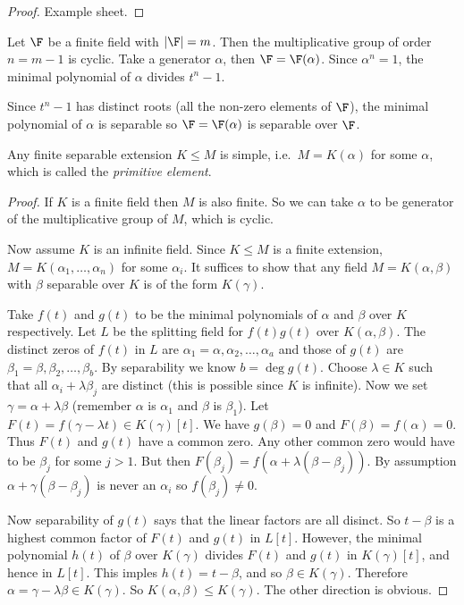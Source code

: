 \documentclass[a4paper]{article}
\begin{document}
\begin{proof}
  Example sheet.
\end{proof}

\begin{eg}
  Let \(\F\) be a finite field with \(|\F| = m\). Then the multiplicative group of order \(n = m - 1\) is cyclic. Take a generator \(\alpha\), then \(\F = \F(\alpha)\). Since \(\alpha^n = 1\), the minimal polynomial of \(\alpha\) divides \(t^n - 1\).

  Since \(t^n - 1\) has distinct roots (all the non-zero elements of \(\F\)), the minimal polynomial of \(\alpha\) is separable so \(\F = \F(\alpha)\) is separable over \(\F\).
\end{eg}

\begin{theorem}
  \label{thm:primitive}
  Any finite separable extension \(K \leq M\) is simple, i.e.\ \(M = K(\alpha)\) for some \(\alpha\), which is called the \emph{primitive element}.
\end{theorem}

\begin{proof}
  \label{proof:primitive}
  If \(K\) is a finite field then \(M\) is also finite. So we can take \(\alpha\) to be generator of the multiplicative group of \(M\), which is cyclic.

  Now assume \(K\) is an infinite field. Since \(K \leq M\) is a finite extension, \(M = K(\alpha_1, \dots, \alpha_n)\) for some \(\alpha_i\). It suffices to show that any field \(M = K(\alpha, \beta)\) with \(\beta\) separable over \(K\) is of the form \(K(\gamma)\).

  Take \(f(t)\) and \(g(t)\) to be the minimal polynomials of \(\alpha\) and \(\beta\) over \(K\) respectively. Let \(L\) be the splitting field for \(f(t)g(t)\) over \(K(\alpha, \beta)\). The distinct zeros of \(f(t)\) in \(L\) are \(\alpha_1 = \alpha, \alpha_2, \dots, \alpha_a\) and those of \(g(t)\) are \(\beta_1 = \beta, \beta_2, \dots, \beta_b\). By separability we know \(b = \deg g(t)\). Choose \(\lambda \in K\) such that all \(\alpha_i + \lambda \beta_j\) are distinct (this is possible since \(K\) is infinite). Now we set \(\gamma = \alpha + \lambda \beta\) (remember \(\alpha\) is \(\alpha_1\) and \(\beta\) is \(\beta_1\)). Let \(F(t) = f(\gamma - \lambda t) \in K(\gamma)[t]\). We have \(g(\beta) = 0\) and \(F(\beta) = f(\alpha) = 0\). Thus \(F(t)\) and \(g(t)\) have a common zero. Any other common zero would have to be \(\beta_j\) for some \(j > 1\). But then \(F(\beta_j) = f(\alpha + \lambda(\beta - \beta_j))\). By assumption \(\alpha + \gamma(\beta - \beta_j)\) is never an \(\alpha_i\) so \(f(\beta_j) \neq 0\).

  Now separability of \(g(t)\) says that the linear factors are all disinct. So \(t - \beta\) is a highest common factor of \(F(t)\) and \(g(t)\) in \(L[t]\). However, the minimal polynomial \(h(t)\) of \(\beta\) over \(K(\gamma)\) divides \(F(t)\) and \(g(t)\) in \(K(\gamma)[t]\), and hence in \(L[t]\). This imples \(h(t) = t - \beta\), and so \(\beta \in K(\gamma)\). Therefore \(\alpha = \gamma - \lambda \beta \in K(\gamma)\). So \(K(\alpha, \beta) \leq K(\gamma)\). The other direction is obvious.
\end{proof}
\end{document}
